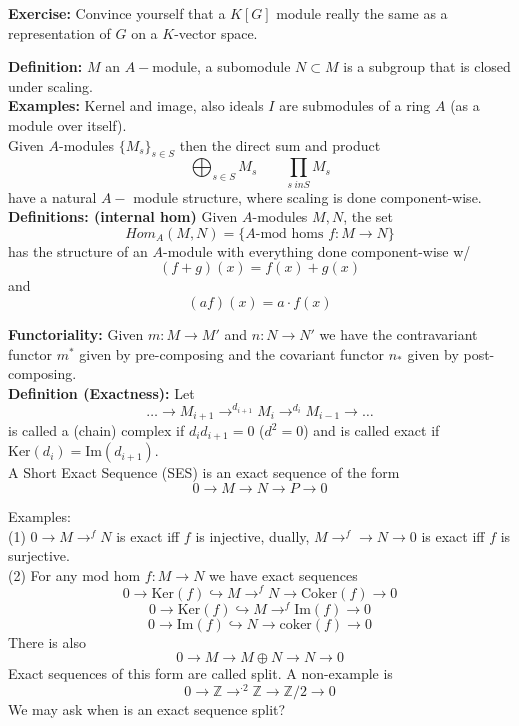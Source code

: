 \documentclass{article}
\newcommand{\Z}{\mathbb{Z}}
\begin{document}
\textbf{Exercise:} Convince yourself that a $K[G]$ module really the same as a representation of $G$ on a $K$-vector space.

\textbf{Definition:} $M$ an $A-$module, a subomodule $N \subset M$ is a subgroup that is closed under scaling.\\

\textbf{Examples:} Kernel and image, also ideals $I$ are submodules of a ring $A$ (as a module over itself).\\

Given $A$-modules $\{M_s\}_{s \in S}$ then the direct sum and product 
\[\bigoplus_{s \in S}M_s \quad \quad \prod_{s\ inS} M_s\]
have a natural $A-$ module structure, where scaling is done component-wise.\\

\textbf{Definitions: (internal hom)} Given $A$-modules $M,N$, the set 
\[Hom_A(M,N) = \{\text{$A$-mod homs $f:M \to N$}\}\]
has the structure of an $A$-module with everything done component-wise w/
\[(f+g)(x) = f(x) + g(x)\]
and 
\[(af)(x) = a \cdot f(x)\]

\textbf{Functoriality:} Given $m: M \to M'$ and $n:N \to N'$ we have the contravariant functor $m^*$ given by pre-composing and the covariant functor $n_*$ given by post-composing.\\

\textbf{Definition (Exactness): } Let 
\[ \dots \to M_{i+1} \to^{d_{i+1}} M_i \to^{d_i} M_{i-1} \to \dots\]
is called a (chain) complex if $d_id_{i+1} = 0$ ($d^2 = 0$)
and is called exact if $\text{Ker}(d_i) = \text{Im}(d_{i+1})$.\\

A Short Exact Sequence (SES) is an exact sequence of the form 
\[0 \to M \to N \to P \to 0\]

Examples:\\
\indent (1) $0 \to M \to^f N$ is exact iff $f$ is injective, dually, $M \to^f \to N \to 0$ is exact iff $f$ is surjective.\\

\indent (2) For any mod hom $f: M \to N$ we have exact sequences 
\[0 \to \text{Ker}(f) \hookrightarrow M \to^f N \to \text{Coker}(f) \to 0\]
\[0 \to \text{Ker}(f) \hookrightarrow M \to^f \text{Im}(f) \to 0\]
\[0 \to \text{Im}(f) \hookrightarrow N \to \text{coker}(f) \to 0\]
There is also 
\[0 \to M \to M \oplus N \to N \to 0\]
Exact sequences of this form are called split. 
A non-example is 
\[0 \to \Z \to^{\cdot 2} \Z \to \Z/2 \to 0\]
We may ask when is an exact sequence split?
\end{document}

